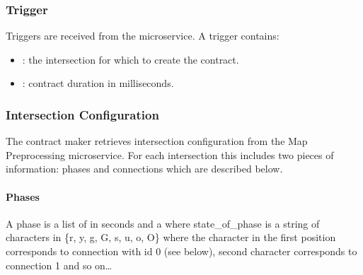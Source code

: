 \documentclass[letterpaper,10pt,english]{sphinxmanual}
\begin{document}
\subsubsection{Trigger}
\label{\detokenize{microservices/contract_maker/input:trigger}}
Triggers are received from the  microservice.
A trigger contains:
\begin{itemize}
\item {} 
: the intersection for which to create the contract.

\item {} 
: contract duration in milliseconds.

\end{itemize}


\subsubsection{Intersection Configuration}
\label{\detokenize{microservices/contract_maker/input:intersection-configuration}}
The contract maker retrieves intersection configuration from the Map Preprocessing microservice.
For each intersection this includes two pieces of information: phases and connections which are described below.


\paragraph{Phases}
\label{\detokenize{microservices/contract_maker/input:phases}}
A phase is a list of  in seconds and  a  where state\_of\_phase is a string of characters in \{r, y, g, G, s, u, o, O\} where the character in the first position corresponds to connection with id 0 (see below), second character corresponds to connection 1 and so on…
\end{document}

